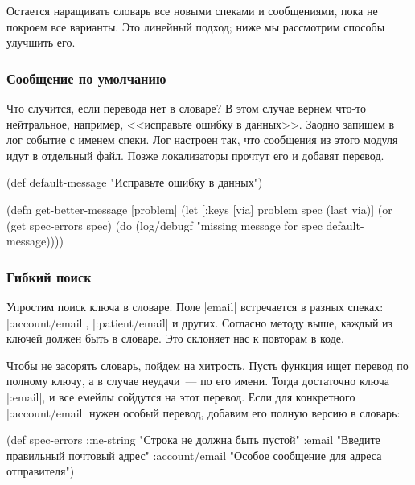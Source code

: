 Остается наращивать словарь все новыми спеками и сообщениями, пока не покроем
все варианты. Это линейный подход; ниже мы рассмотрим способы улучшить его.

\subsubsection{Сообщение по умолчанию}

Что случится, если перевода нет в словаре? В этом случае вернем что-то
нейтральное, например, <<исправьте ошибку в данных>>. Заодно запишем в лог
событие с именем спеки. Лог настроен так, что сообщения из этого модуля идут в
отдельный файл. Позже локализаторы прочтут его и добавят перевод.

  \begin{clojure}
(def default-message
  "Исправьте ошибку в данных")

(defn get-better-message [problem]
  (let [{:keys [via]} problem
        spec (last via)]
    (or (get spec-errors spec)
        (do (log/debugf "missing message for spec %
            default-message))))
  \end{clojure}

\subsubsection{Гибкий поиск}

Упростим поиск ключа в словаре. Поле \spverb|email| встречается в разных спеках:
\spverb|:account/email|, \spverb|:patient/email| и других. Согласно методу выше,
каждый из ключей должен быть в словаре. Это склоняет нас к повторам в коде.

Чтобы не засорять словарь, пойдем на хитрость. Пусть функция ищет перевод по
полному ключу, а в случае неудачи~--- по его имени. Тогда достаточно ключа
\spverb|:email|, и все емейлы сойдутся на этот перевод. Если для конкретного
\spverb|:account/email| нужен особый перевод, добавим его полную версию в словарь:

  \begin{clojure}
(def spec-errors
  {::ne-string "Строка не должна быть пустой"
   :email "Введите правильный почтовый адрес"
   :account/email "Особое сообщение для адреса отправителя"})
  \end{clojure}

